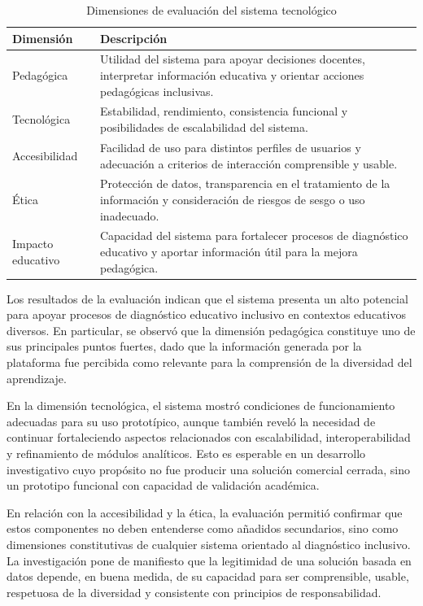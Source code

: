 \begin{refsection}
\begin{table}[htbp]
\centering
\caption{Dimensiones de evaluación del sistema tecnológico}
\begin{tabularx}{\textwidth}{@{}p{3.5cm}Y@{}}
\toprule
\textbf{Dimensión} & \textbf{Descripción} \\
\midrule
Pedagógica & Utilidad del sistema para apoyar decisiones docentes, interpretar información educativa y orientar acciones pedagógicas inclusivas. \\
Tecnológica & Estabilidad, rendimiento, consistencia funcional y posibilidades de escalabilidad del sistema. \\
Accesibilidad & Facilidad de uso para distintos perfiles de usuarios y adecuación a criterios de interacción comprensible y usable. \\
Ética & Protección de datos, transparencia en el tratamiento de la información y consideración de riesgos de sesgo o uso inadecuado. \\
Impacto educativo & Capacidad del sistema para fortalecer procesos de diagnóstico educativo y aportar información útil para la mejora pedagógica. \\
\bottomrule
\end{tabularx}
\label{tab:evaluacion-sistema-ch06}
\end{table}

Los resultados de la evaluación indican que el sistema presenta un alto potencial para apoyar procesos de diagnóstico educativo inclusivo en contextos educativos diversos. En particular, se observó que la dimensión pedagógica constituye uno de sus principales puntos fuertes, dado que la información generada por la plataforma fue percibida como relevante para la comprensión de la diversidad del aprendizaje.

En la dimensión tecnológica, el sistema mostró condiciones de funcionamiento adecuadas para su uso prototípico, aunque también reveló la necesidad de continuar fortaleciendo aspectos relacionados con escalabilidad, interoperabilidad y refinamiento de módulos analíticos. Esto es esperable en un desarrollo investigativo cuyo propósito no fue producir una solución comercial cerrada, sino un prototipo funcional con capacidad de validación académica.

En relación con la accesibilidad y la ética, la evaluación permitió confirmar que estos componentes no deben entenderse como añadidos secundarios, sino como dimensiones constitutivas de cualquier sistema orientado al diagnóstico inclusivo. La investigación pone de manifiesto que la legitimidad de una solución basada en datos depende, en buena medida, de su capacidad para ser comprensible, usable, respetuosa de la diversidad y consistente con principios de responsabilidad.


\end{refsection}
